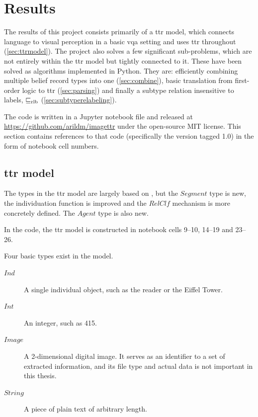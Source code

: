 \renewcommand{\sectionautorefname}{Section}
\let\subsectionautorefname\sectionautorefname
\let\subsubsectionautorefname\sectionautorefname
\section{Results}
\label{sec:results}

The results of this project consists primarily of a \gls{ttr} model, which connects language to visual perception in a basic \gls{vqa} setting and uses \gls{ttr} throughout (\autoref{sec:ttrmodel}).
The project also solves a few significant sub-problems, which are not entirely within the \gls{ttr} model but tightly connected to it.
These have been solved as algorithms implemented in Python.
They are: efficiently combining multiple belief record types into one (\autoref{sec:combine}), basic translation from first-order logic to \gls{ttr} (\autoref{sec:parsing}) and finally a subtype relation insensitive to labels, $\mathrel{\sqsubseteq_\text{rlb}}$ (\autoref{sec:subtyperelabeling}).

The code is written in a Jupyter notebook file and released at \url{https://github.com/arildm/imagettr} under the open-source MIT license.
This section contains references to that code (specifically the version tagged 1.0) in the form of notebook cell numbers.



\subsection{\Gls{ttr} model}
\label{sec:ttrmodel}

The types in the \gls{ttr} model are largely based on \cite{lspc}, but the $Segment$ type is new, the individuation function is improved and the $RelClf$ mechanism is more concretely defined.
The $Agent$ type is also new.

In the code, the \gls{ttr} model is constructed in notebook cells 9–10, 14–19 and 23–26.

Four basic types exist in the model.

\begin{description}
\item [$Ind$] A single individual object, such as the reader or the Eiffel Tower.
\item [$Int$] An integer, such as 415.
\item [$Image$] A 2-dimensional digital image.
It serves as an identifier to a set of extracted information, and its file type and actual data is not important in this thesis.
\item [$String$] A piece of plain text of arbitrary length.
\end{description}

